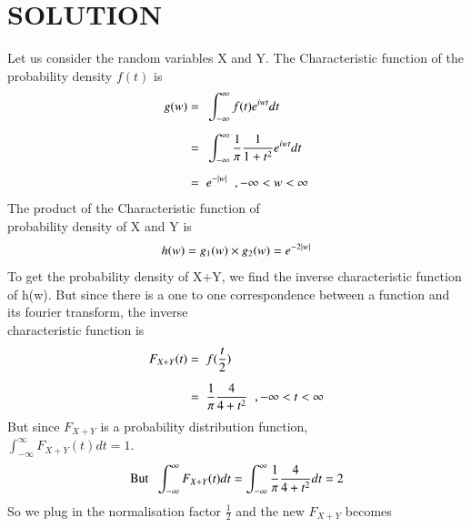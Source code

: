 \documentclass[journal,12pt,twocolumn]{IEEEtran}
\begin{document}
        \section*{SOLUTION}
        Let us consider the random variables X and Y.
        The Characteristic function of the probability density $f(t)$ is
        \begin{align}
            g(w) =\hspace{0.2cm} & \int_{-\infty}^{\infty}  f(t) {e}^{iwt} dt                                         \\[0.2cm]
            =\hspace{0.2cm}      & \int_{-\infty}^{\infty}  \displaystyle\frac{1}{\pi} \frac{1}{1+{t}^2} {e}^{iwt} dt \\[0.2cm]
            =\hspace{0.2cm}      & e^{-\vert w\vert}\hspace{0.2cm}, -\infty<w<\infty
        \end{align}
        The product of the Characteristic function of \\probability density of X and Y is
        \begin{align}
            h(w) = g_1(w) \times g_2(w) = {e}^{-2\vert w\vert}
        \end{align}
        To get the probability density of X+Y, we find the inverse characteristic function of h(w). But since there is a one to one correspondence between a function and its fourier transform,
        the inverse \\characteristic function is
        \begin{align}
            F_{X+Y}(t) =\hspace{0.2cm} & f(\frac{t}{2})                                   \\[0.2cm]
            =\hspace{0.2cm}            & \frac{1}{\pi} \frac{4}{4+{t}^2} \hspace{0.2cm},-\infty<t<\infty 
        \end{align}
        But since $F_{X+Y}$ is a probability distribution function,\\[0.2cm]$\displaystyle\int_{-\infty}^{\infty} F_{X+Y}(t) dt= 1$.
\begin{align}
    \text{But}\hspace{0.2cm} \int_{-\infty}^{\infty} F_{X+Y}(t) dt = \int_{-\infty}^{\infty} \frac{1}{\pi}\frac{4}{4+{t^2}} dt= 2
\end{align}
So we plug in the normalisation factor $\displaystyle\frac{1}{2}$ and the new $F_{X+Y}$ becomes
\end{document}
